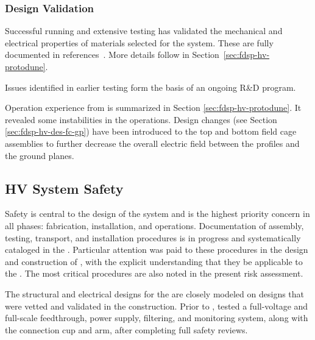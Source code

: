 \subsubsection{Design Validation}
\label{sec:fdsp-hv-des-des-val}

Successful  running and extensive testing has %
validated the mechanical and electrical properties of materials selected for the  system.  These are fully documented in references~\cite{bib:docdb2338, bib:docdb1504, bib:docdb1601}. More details follow in Section~\ref{sec:fdsp-hv-protodune}.


Issues identified in earlier testing form the basis of an ongoing R\&D program. 

Operation experience from  is summarized in Section \ref{sec:fdsp-hv-protodune}. It revealed some instabilities in the  operations.  Design changes (see Section \ref{sec:fdsp-hv-des-fc-gp}) have been introduced to the top and bottom field cage assemblies to further decrease the overall electric field between the profiles and the ground planes.


\subsection{HV System Safety}
\label{fdsp-hv-design-safety}

Safety is central to the design of the  system and is the highest priority concern in all phases: fabrication, installation, and operations. Documentation of assembly, testing, transport, and installation procedures is in progress and systematically cataloged in the . Particular attention was paid to these procedures in the design and construction of , with the explicit understanding that they be applicable to the . The most critical procedures are also noted in the present  risk assessment. 

The structural and electrical designs for the   are closely modeled on designs that were vetted and validated in the  construction. 
Prior to ,  tested a full-voltage and full-scale  feedthrough, power supply, filtering, and monitoring system, along with the  connection cup and arm,  %
after completing full safety reviews. 

